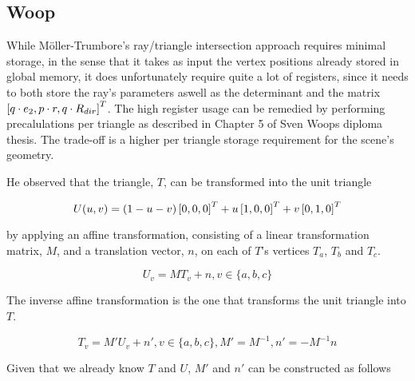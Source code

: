 \subsection{Woop}


While Möller-Trumbore's ray/triangle intersection approach requires minimal
storage, in the sense that it takes as input the vertex positions already stored
in global memory, it does unfortunately require quite a lot of registers, since
it needs to both store the ray's parameters aswell as the determinant and the
matrix $\left[q \cdot e_2, p \cdot r, q \cdot R_{dir} \right]^T$. The high register
usage can be remedied by performing precalulations per triangle as described in
Chapter 5 of Sven Woops diploma thesis. The trade-off
is a higher per triangle storage requirement for the scene's geometry.




He observed that the triangle, $T$, can be transformed into the unit triangle

\begin{displaymath}
  U(u, v) = (1-u-v)\left[0, 0, 0 \right]^T + u\left[1, 0, 0 \right]^T + v\left[0, 1, 0 \right]^T
\end{displaymath}

by applying an affine transformation, consisting of a linear transformation
matrix, $M$, and a translation vector, $n$, on each of $T$'s vertices $T_a$,
$T_b$ and $T_c$.

\begin{displaymath}
  U_v = M T_v + n, v \in \{a, b, c\}
\end{displaymath}

The inverse affine transformation is the one that transforms the unit
triangle into $T$.

\begin{displaymath}
  T_v = M' U_v + n', v \in \{a, b, c\}, M' = M^{-1}, n' = -M^{-1}n
\end{displaymath}

Given that we already know $T$ and $U$, $M'$ and $n'$ can be
constructed as follows

